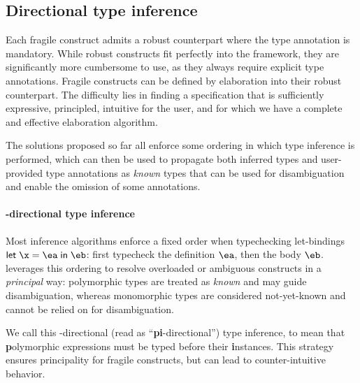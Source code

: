 \documentclass[acmsmall,screen,nonacm,review]{acmart}
\begin{document}
\subsection{Directional type inference}

Each fragile construct admits
a robust counterpart where the type annotation is mandatory. While
robust constructs fit perfectly into the \ML framework, they are
significantly more cumbersome to use, as they always require explicit type
annotations. Fragile constructs can be defined by elaboration into their
robust counterpart.
%
%
The difficulty lies in finding a specification
that is sufficiently expressive, principled, intuitive for the user,
and for which we have a complete and effective elaboration algorithm.

The solutions proposed so far all enforce some ordering in which type
inference is performed, which can then be used to propagate both inferred
types and user-provided type annotations as \emph{known} types that can be
used for disambiguation and enable the omission of some annotations.


\paragraph{\Geninst-directional type inference}


Most \ML inference algorithms enforce a fixed order when typechecking
let-bindings $\elet \x \ea \eb$: first typecheck the definition $\ea$, then
the body $\eb$. \OCaml leverages this ordering to resolve overloaded or
ambiguous constructs in a \emph{principal} way: polymorphic types
are treated as \emph{known} and may guide disambiguation, whereas monomorphic
types are considered not-yet-known and cannot be relied on for disambiguation.


We call this \textbf{\geninst}-directional (read as
``\textbf{pi}-directional'') type inference, to mean that \textbf{p}olymorphic
expressions must be typed before their \textbf{i}nstances. This strategy
ensures principality for fragile constructs, but can lead to counter-intuitive
behavior.

\end{document}
